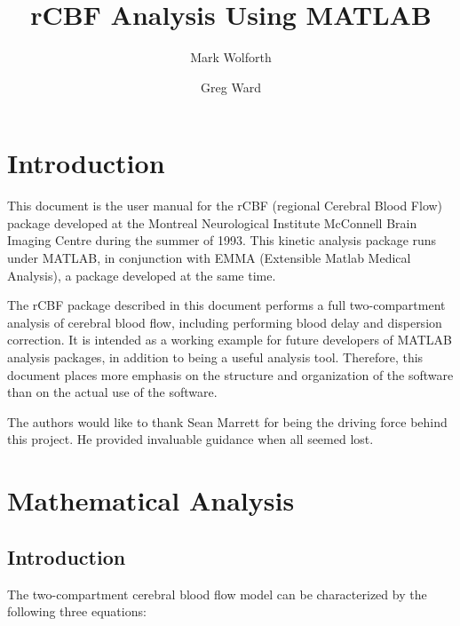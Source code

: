 
\title{rCBF Analysis Using MATLAB}
\author{Mark Wolforth \and Greg Ward}

\def\code#1{{\tt #1}}



\maketitle
\newpage

\tableofcontents

\newpage
\section{Introduction}

This document is the user manual for the rCBF (regional Cerebral
Blood Flow) package developed at the Montreal Neurological Institute
McConnell Brain Imaging Centre during the summer of 1993.  This
kinetic analysis package runs under MATLAB, in conjunction with EMMA
(Extensible Matlab Medical Analysis), a package developed at the same
time.

The rCBF package described in this document performs a full
two-compartment analysis of cerebral blood flow, including performing
blood delay and dispersion correction.  It is intended as a working
example for future developers of MATLAB analysis packages, in
addition to being a useful analysis tool.  Therefore, this document
places more emphasis on the structure and organization of the
software than on the actual use of the software.

The authors would like to thank Sean Marrett for being the driving
force behind this project.  He provided invaluable guidance when all
seemed lost.

\newpage
\section{Mathematical Analysis}

\subsection{Introduction}

The two-compartment cerebral blood flow model can be characterized by
the following three equations:

